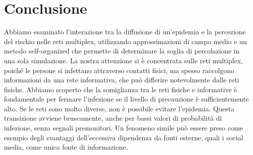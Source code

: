 \section{Conclusione}\label{sec:conclusione}
    Abbiamo esaminato l'interazione tra la diffusione di un'epidemia e la percezione del rischio nelle reti multiplex,
    utilizzando approssimazioni di campo medio e un metodo self-organized che permette di determinare la soglia
    di percolazione in una sola simulazione.
    La nostra attenzione si è concentrata sulle reti multiplex, poiché le persone si infettano attraverso contatti
    fisici, ma spesso raccolgono informazioni da una rete informativa, che può differire notevolmente dalle reti fisiche.
    Abbiamo scoperto che la somiglianza tra le reti fisiche e informative è fondamentale per fermare l'infezione se il
    livello di precauzione è sufficientemente alto.
    Se le reti sono molto diverse, non è possibile evitare l'epidemia.
    Questa transizione avviene bruscamente, anche per bassi valori di probabilità di infezione, senza segnali
    premonitori.
    Un fenomeno simile può essere preso come esempio degli svantaggi dell'eccessiva dipendenza da fonti esterne,
    quali i social media, come unica fonte di informazione.